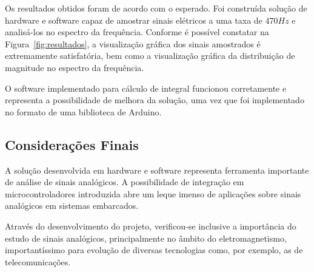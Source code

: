 \documentclass[12pt,a4paper]{report}
\begin{document}
Os resultados obtidos foram de acordo com o esperado. Foi construída solução de hardware e software capaz de amostrar sinais elétricos a uma taxa de \(470 Hz\) e analisá-los no espectro da frequência. Conforme é possível constatar na Figura~\ref{fig:resultados}, a visualização gráfica dos sinais amostrados é extremamente satisfatória, bem como a visualização gráfica da distribuição de magnitude no espectro da frequência.

O software implementado para cálculo de integral funcionou corretamente e representa a possibilidade de melhora da solução, uma vez que foi implementado no formato de uma biblioteca de Arduino.

\subsection{Considerações Finais}

A solução desenvolvida em hardware e software representa ferramenta importante de análise de sinais analógicos. A possibilidade de integração em microcontroladores introduzida abre um leque imenso de aplicações sobre sinais analógicos em sistemas embarcados.

Através do desenvolvimento do projeto, verificou-se inclusive a importância do estudo de sinais analógicos, principalmente no âmbito do eletromagnetismo, importantíssimo para evolução de diversas tecnologias como, por exemplo, as de telecomunicações.
\end{document}
